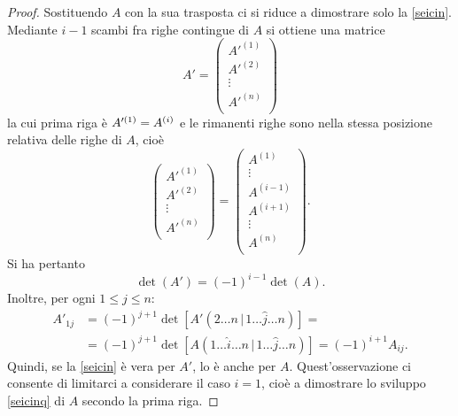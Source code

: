 \documentclass{article}
\theoremstyle{plain}
\theoremstyle{definition}
\theoremstyle{remark}
\begin{document}
\begin{proof}
    Sostituendo $A$ con la sua trasposta ci si riduce a dimostrare solo la \ref{seicin}. Mediante $i-1$ scambi fra righe contingue di $A$ si ottiene una matrice
    \[A'=\begin{pmatrix}
        A'^{(1)}\\
        A'^{(2)}\\
        \vdots\\
        A'^{(n)}\\
    \end{pmatrix}\]
    la cui prima riga è $A'^{(1)}=A^{(i)}\\$ e le rimanenti righe sono nella stessa posizione relativa delle righe di $A$, cioè 
    \[\begin{pmatrix}
        A'^{(1)}\\
        A'^{(2)}\\
        \vdots\\
        A'^{(n)}\\
    \end{pmatrix}=\begin{pmatrix}
        A^{(1)}\\
        \vdots\\
        A^{(i-1)}\\
        A^{(i+1)}\\
        \vdots\\
        A^{(n)}\\
    \end{pmatrix}.\]
    Si ha pertanto \[\det(A')=(-1)^{i-1}\det(A).\]
    Inoltre, per ogni $1\leq j\leq n$: 
    \begin{align*}
        A'_{1j}&=(-1)^{j+1}\det[A'(2\ldots n\,|\,1\ldots \hat{j}\ldots n)]=\\
        &=(-1)^{j+1}\det[A(1\ldots \hat{i}\ldots n\,|\,1\ldots \hat{j}\ldots n)]=(-1)^{i+1}A_{ij}.
    \end{align*}
    Quindi, se la \ref{seicin} è vera per $A'$, lo è anche per $A$. Quest'osservazione ci consente di limitarci a considerare il caso $i=1$, cioè a dimostrare lo sviluppo \ref{seicinq} di $A$ secondo la prima riga.


\end{proof}
\end{document}
